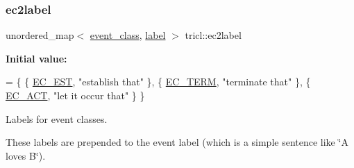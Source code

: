 \subsubsection{\texorpdfstring{ec2label}{ec2label}}
{\footnotesize\ttfamily unordered\+\_\+map$<$ \hyperlink{namespacetricl_a6967089e2c0837f273d8cb5fd9f7e46d}{event\+\_\+class}, \hyperlink{namespacetricl_a77e7daffafa870e5786b344119da9b15}{label} $>$ tricl\+::ec2label}

{\bfseries Initial value\+:}
\begin{DoxyCode}
= \{
        \{ \hyperlink{namespacetricl_a6967089e2c0837f273d8cb5fd9f7e46da928305067790de15396de8fcc92b72b9}{EC\_EST}, \textcolor{stringliteral}{"establish that"} \},    
        \{ \hyperlink{namespacetricl_a6967089e2c0837f273d8cb5fd9f7e46da16f53be37a75a1cdfc726014c7f3810a}{EC\_TERM}, \textcolor{stringliteral}{"terminate that"} \},   
        \{ \hyperlink{namespacetricl_a6967089e2c0837f273d8cb5fd9f7e46dac508c68c92ee059322cb644dd330bbcf}{EC\_ACT}, \textcolor{stringliteral}{"let it occur that"} \}  
    \}
\end{DoxyCode}


Labels for event classes. 

These labels are prepended to the event label (which is a simple sentence like \char`\"{}\+A loves B\char`\"{}). 